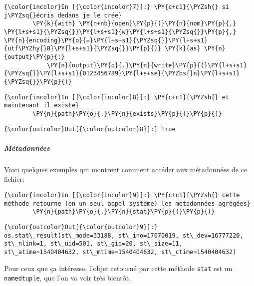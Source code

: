     \begin{Verbatim}[commandchars=\\\{\}]
{\color{incolor}In [{\color{incolor}7}]:} \PY{c+c1}{\PYZsh{} si j\PYZsq{}écris dedans je le crée}
        \PY{k}{with} \PY{n+nb}{open}\PY{p}{(}\PY{n}{nom}\PY{p}{,} \PY{l+s+s1}{\PYZsq{}}\PY{l+s+s1}{w}\PY{l+s+s1}{\PYZsq{}}\PY{p}{,} \PY{n}{encoding}\PY{o}{=}\PY{l+s+s1}{\PYZsq{}}\PY{l+s+s1}{utf\PYZhy{}8}\PY{l+s+s1}{\PYZsq{}}\PY{p}{)} \PY{k}{as} \PY{n}{output}\PY{p}{:}
            \PY{n}{output}\PY{o}{.}\PY{n}{write}\PY{p}{(}\PY{l+s+s1}{\PYZsq{}}\PY{l+s+s1}{0123456789}\PY{l+s+se}{\PYZbs{}n}\PY{l+s+s1}{\PYZsq{}}\PY{p}{)}
\end{Verbatim}


    \begin{Verbatim}[commandchars=\\\{\}]
{\color{incolor}In [{\color{incolor}8}]:} \PY{c+c1}{\PYZsh{} et maintenant il existe}
        \PY{n}{path}\PY{o}{.}\PY{n}{exists}\PY{p}{(}\PY{p}{)}
\end{Verbatim}


\begin{Verbatim}[commandchars=\\\{\}]
{\color{outcolor}Out[{\color{outcolor}8}]:} True
\end{Verbatim}
            
    \hypertarget{muxe9tadonnuxe9es}{%
\subparagraph{Métadonnées}\label{muxe9tadonnuxe9es}}

    Voici quelques exemples qui montrent comment accéder aux métadonnées de
ce fichier:

    \begin{Verbatim}[commandchars=\\\{\}]
{\color{incolor}In [{\color{incolor}9}]:} \PY{c+c1}{\PYZsh{} cette méthode retourne (en un seul appel système) les métadonnées agrégées}
        \PY{n}{path}\PY{o}{.}\PY{n}{stat}\PY{p}{(}\PY{p}{)}
\end{Verbatim}


\begin{Verbatim}[commandchars=\\\{\}]
{\color{outcolor}Out[{\color{outcolor}9}]:} os.stat\_result(st\_mode=33188, st\_ino=17070019, st\_dev=16777220, st\_nlink=1, st\_uid=501, st\_gid=20, st\_size=11, st\_atime=1540404632, st\_mtime=1540404632, st\_ctime=1540404632)
\end{Verbatim}
            
    Pour ceux que ça intéresse, l'objet retourné par cette méthode
\texttt{stat} est un \texttt{namedtuple}, que l'on va voir très bientôt.

